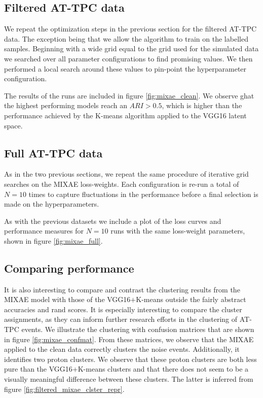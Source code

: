 \documentclass[review,number,sort&compress]{elsarticle}
\begin{document}
\subsection{Filtered AT-TPC data}

We repeat the optimization steps in the previous section for the filtered AT-TPC data. The exception being that we allow the algorithm to train on the labelled samples. Beginning with a wide grid equal to the grid used for the simulated data we searched over all parameter configurations to find promising values. We then performed a local search around these values to pin-point the hyperparameter configuration.

\noindent The results of the runs are included in figure \ref{fig:mixae_clean}. We observe ghat the highest performing models reach an $ARI > 0.5$, which is higher than the performance achieved by the K-means algorithm applied to the VGG16 latent space. 




\subsection{Full AT-TPC data}

As in the two previous sections, we repeat the same procedure of iterative grid searches on the MIXAE loss-weights. Each configuration is re-run a total of $N=10$ times to capture fluctuations in the performance before a final selection is made on the hyperparameters. 

\noindent As with the previous datasets we include a plot of the loss curves and performance measures for $N=10$ runs with the same loss-weight parameters, shown in figure \ref{fig:mixae_full}.



\subsection{Comparing performance}

It is also interesting to compare and contrast the clustering results from the MIXAE model with those of the VGG16$+$K-means outside the fairly abstract accuracies and rand scores. It is especially interesting to compare the cluster assignments, as they can inform further research efforts in the clustering of AT-TPC events. We illustrate the clustering with confusion matrices that are shown in figure \ref{fig:mixae_confmat}. From these matrices, we observe that the MIXAE applied to the clean data correctly clusters the noise events. Additionally, it identifies two proton clusters. We observe that these proton clusters are both less pure than the VGG16+K-means clusters and that there does not seem to be a visually meaningful difference between these clusters. The latter is inferred from figure \ref{fig:filtered_mixae_clster_repr}. 
\end{document}
